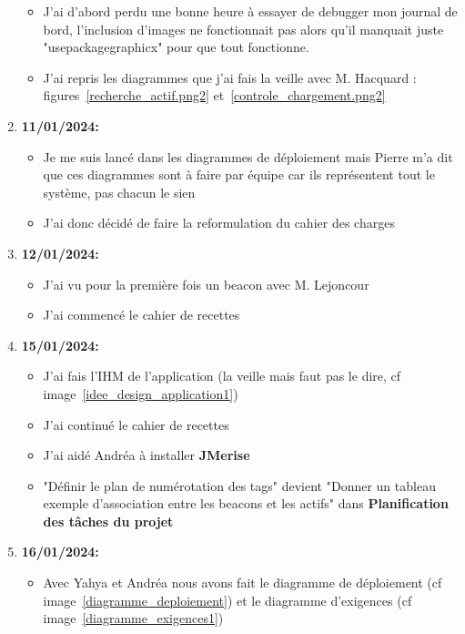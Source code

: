 \documentclass[10pt,a4paper]{book}
\begin{document}
\begin{enumerate}
\begin{itemize}
            \item J'ai d'abord perdu une bonne heure à essayer de debugger mon journal de bord, l'inclusion d'images ne fonctionnait pas alors qu'il manquait juste "usepackage{graphicx}" pour que tout fonctionne.
            \item J'ai repris les diagrammes que j'ai fais la veille avec M. Hacquard : figures~\ref{recherche_actif.png2} et~\ref{controle_chargement.png2} 
        \end{itemize}
    \item \textbf{11/01/2024:}
        \begin{itemize}
            \item Je me suis lancé dans les diagrammes de déploiement mais Pierre m'a dit que ces diagrammes sont à faire par équipe car ils représentent tout le système, pas chacun le sien
            \item J'ai donc décidé de faire la reformulation du cahier des charges
        \end{itemize}
    \item \textbf{12/01/2024:}
        \begin{itemize}
            \item J'ai vu pour la première fois un beacon avec M. Lejoncour
            \item J'ai commencé le cahier de recettes
        \end{itemize}
    \item \textbf{15/01/2024:}
        \begin{itemize}
            \item J'ai fais l'IHM de l'application (la veille mais faut pas le dire, cf image~\ref{idee_design_application1})
            \item J'ai continué le cahier de recettes
            \item J'ai aidé Andréa à installer \textbf{JMerise}
            \item "Définir le plan de numérotation des tags" devient "Donner un tableau exemple d'association entre les beacons et les actifs" dans \textbf{Planification des tâches du projet}
        \end{itemize}
    \item \textbf{16/01/2024:}
        \begin{itemize}
            \item Avec Yahya et Andréa nous avons fait le diagramme de déploiement (cf image~\ref{diagramme_deploiement}) et le diagramme d'exigences  (cf image~\ref{diagramme_exigences1})

\end{itemize}
\end{enumerate}
\end{document}
